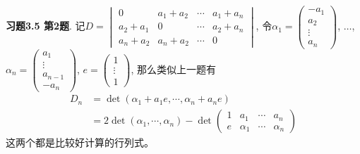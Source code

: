 {\bf 习题3.5 第2题}. 记$D = \begin{vmatrix} 0 & a_1+a_2 & \cdots & a_1+a_n \\ a_2+a_1 & 0 & \cdots & a_2+a_n \\ a_n+a_2 & a_n+a_2 & \cdots & 0 \end{vmatrix}$, 令$\alpha_1 = \begin{pmatrix} -a_1 \\ a_2 \\ \vdots \\ a_n \end{pmatrix}$, $\ldots$, $\alpha_n = \begin{pmatrix} a_1 \\ \vdots \\ a_{n-1} \\ -a_n \end{pmatrix}$, $e = \begin{pmatrix} 1 \\ \vdots \\ 1 \end{pmatrix}$, 那么类似上一题有
\begin{align*}
D_n & = \det(\alpha_1 + a_1e, \cdots, \alpha_n + a_ne) \\
& = 2\det(\alpha_1, \cdots, \alpha_n) - \det\begin{pmatrix} 1 & a_1 & \cdots & a_n \\ e & \alpha_1 & \cdots & \alpha_n \end{pmatrix}
\end{align*}
这两个都是比较好计算的行列式。


